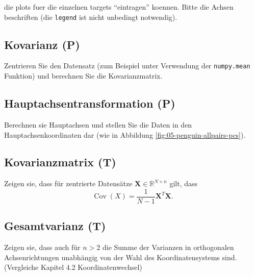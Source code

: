 \documentclass[]{book}
\theoremstyle{definition}
\theoremstyle{definition}
\theoremstyle{definition}
\theoremstyle{definition}
\theoremstyle{remark}
\begin{document}
die plots fuer die einzelnen targets ``eintragen'' koennen. Bitte die Achsen beschriften (die \texttt{legend} ist nicht unbedingt notwendig).

\hypertarget{kovarianz-p}{%
\subsection{Kovarianz (P)}\label{kovarianz-p}}

Zentrieren Sie den Datensatz (zum Beispiel unter Verwendung der \texttt{numpy.mean} Funktion) und berechnen Sie die Kovarianzmatrix.

\hypertarget{hauptachsentransformation-p}{%
\subsection{Hauptachsentransformation (P)}\label{hauptachsentransformation-p}}

Berechnen sie Hauptachsen und stellen Sie die Daten in den Hauptachsenkoordinaten dar (wie in Abbildung \ref{fig:05-penguin-allpairs-pcs}).

\hypertarget{kovarianzmatrix-t}{%
\subsection{Kovarianzmatrix (T)}\label{kovarianzmatrix-t}}

Zeigen sie, dass für zentrierte Datensätze \({\mathbf{X}}\in \mathbb R^{N\times n}\) gilt, dass
\begin{equation*}
\operatorname{Cov}(X) = \frac{1}{N-1}{\mathbf{X}}^T{\mathbf{X}}.
\end{equation*}

\hypertarget{gesamtvarianz-t}{%
\subsection{Gesamtvarianz (T)}\label{gesamtvarianz-t}}

Zeigen sie, dass auch für \(n>2\) die Summe der Varianzen in orthogonalen Achsenrichtungen unabhängig von der Wahl des Koordinatensystems sind. (Vergleiche Kapitel 4.2 Koordinatenwechsel)
\end{document}
